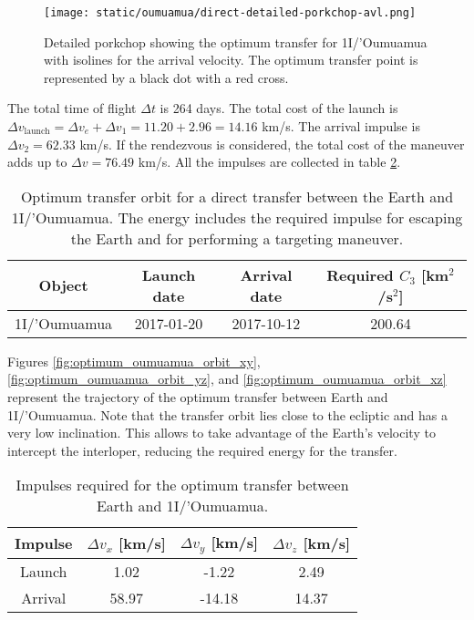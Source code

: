 \begin{figure}[H]
  \centering
  \texttt{[image: static/oumuamua/direct-detailed-porkchop-avl.png]}
  \caption[Detailed porkchop showing the optimum transfer for
    1I/'Oumuamua with the arrival velocity.]{Detailed porkchop showing the
    optimum transfer for 1I/'Oumuamua with isolines for the arrival
    velocity. The optimum transfer point is represented by a black dot
    with a red cross.}
  \label{fig:oumuamua-optimum-porkchop-avl}
\end{figure}

The total time of flight $\Delta t$ is 264 days. The total cost of the launch is
$\Delta v_\text{launch} = \Delta v_e + \Delta v_1 = 11.20 + 2.96 = 14.16$ km/s.
The arrival impulse is $\Delta v_2 = 62.33$ km/s. If the rendezvous is
considered, the total cost of the maneuver adds up to $\Delta v = 76.49$ km/s.
All the impulses are collected in table
\ref{tab:oumuamua-direct-transfer-impulses}.

\vspace{1cm}
\begin{table}[H]
  \centering
  \begin{tabular}{|c|c|c|c|}
    \hline
    Object       & Launch date & Arrival date & Required $C_3$ [km$^2$/s$^2$] \\
    \hline
    1I/'Oumuamua & 2017-01-20  & 2017-10-12   & 200.64                        \\
    \hline
  \end{tabular}
  \caption[Optimum transfer orbit for a direct transfer between the Earth and
    1I/'Oumuamua.]{Optimum transfer orbit for a direct transfer between the
    Earth and 1I/'Oumuamua. The energy includes the required impulse for
    escaping the Earth and for performing a targeting maneuver.}
  \label{tab:oumuamua-direct-transfer-optimum}
\end{table}

Figures \ref{fig:optimum_oumuamua_orbit_xy},
\ref{fig:optimum_oumuamua_orbit_yz}, and \ref{fig:optimum_oumuamua_orbit_xz}
represent the trajectory of the optimum transfer between Earth and 1I/'Oumuamua.
Note that the transfer orbit lies close to the ecliptic and has a very low
inclination. This allows to take advantage of the Earth's velocity to intercept
the interloper, reducing the required energy for the transfer.

\vspace{1cm}
\begin{table}[H]
  \centering
  \begin{tabular}{|c|c|c|c|}
    \hline
    Impulse & $\Delta v_x$ [km/s] & $\Delta v_y$ [km/s] & $\Delta v_z$ [km/s] \\
    \hline
    Launch  & 1.02                & -1.22               & 2.49                \\
    \hline
    Arrival & 58.97               & -14.18              & 14.37               \\
    \hline
  \end{tabular}
  \caption{Impulses required for the optimum transfer between Earth and 1I/'Oumuamua.}
  \label{tab:oumuamua-direct-transfer-impulses}
\end{table}


